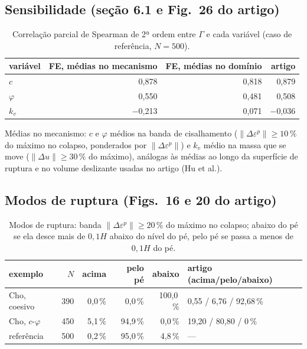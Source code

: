 \documentclass[11pt,a4paper]{article}
\newcommand{\Gam}{\Gamma}
\begin{document}
\subsection{Sensibilidade (seção 6.1 e Fig.~26 do artigo)}
\begin{table}[H]\centering\small\caption{Correlação parcial de Spearman de 2ª ordem entre $\Gam$ e cada variável (caso de referência, $N = 500$).}\begin{tabular}{lrrr}\toprule variável & FE, médias no mecanismo & FE, médias no domínio & artigo\\\midrule
$c$ & 0{,}878 & 0{,}818 & 0,879\\
$\varphi$ & 0{,}550 & 0{,}481 & 0,508\\
$k_v$ & $-$0{,}213 & 0{,}071 & $-$0,036\\
\bottomrule\end{tabular}\end{table}
Médias no mecanismo: $c$ e $\varphi$ médios na banda de cisalhamento ($\|\Delta\varepsilon^p\| \ge 10\,\%$ do máximo no colapso, ponderados por $\|\Delta\varepsilon^p\|$) e $k_v$ médio na massa que se move ($\|\Delta u\| \ge 30\,\%$ do máximo), análogas às médias ao longo da superfície de ruptura e no volume deslizante usadas no artigo (Hu et al.).
\subsection{Modos de ruptura (Figs.~16 e 20 do artigo)}
\begin{table}[H]\centering\small\caption{Modos de ruptura: banda $\|\Delta\varepsilon^p\| \ge 20\,\%$ do máximo no colapso; abaixo do pé se ela desce mais de $0{,}1H$ abaixo do nível do pé, pelo pé se passa a menos de $0{,}1H$ do pé.}\begin{tabular}{lrrrrl}\toprule exemplo & $N$ & acima & pelo pé & abaixo & artigo (acima/pelo/abaixo)\\\midrule
Cho, coesivo & 390 & 0{,}0\,\% & 0{,}0\,\% & 100{,}0\,\% & 0,55 / 6,76 / 92,68\,\%\\
Cho, $c$-$\varphi$ & 450 & 5{,}1\,\% & 94{,}9\,\% & 0{,}0\,\% & 19,20 / 80,80 / 0\,\%\\
referência & 500 & 0{,}2\,\% & 95{,}0\,\% & 4{,}8\,\% & ---\\
\bottomrule\end{tabular}\end{table}
\end{document}
